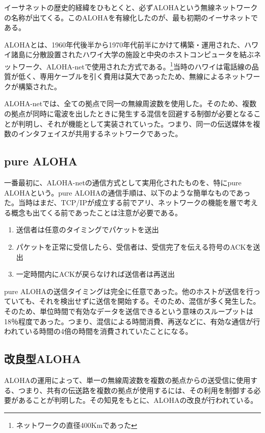 イーサネットの歴史的経緯をひもとくと、必ずALOHAという無線ネットワークの名称が出てくる。このALOHAを有線化したのが、最も初期のイーサネットである。

ALOHAとは、1960年代後半から1970年代前半にかけて構築・運用された、ハワイ諸島に分散設置されたハワイ大学の施設と中央のホストコンピュータを結ぶネットワーク、ALOHA-netで使用された方式である。\footnote{ネットワークの直径400Kmであった}当時のハワイは電話線の品質が低く、専用ケーブルを引く費用は莫大であったため、無線によるネットワークが構築された。

ALOHA-netでは、全ての拠点で同一の無線周波数を使用した。そのため、複数の拠点が同時に電波を出したときに発生する混信を回避する制御が必要となることが判明し、それが機能として実装されていった。つまり、同一の伝送媒体を複数のインタフェイスが共用するネットワークであった。

\subsection{pure ALOHA}

一番最初に、ALOHA-netの通信方式として実用化されたものを、特にpure ALOHAという。pure ALOHAの通信手順は、以下のような簡単なものであった。当時はまだ、TCP/IPが成立する前でアリ、ネットワークの機能を層で考える概念も出てくる前であったことは注意が必要である。

\begin{enumerate}
\item 送信者は任意のタイミングでパケットを送出
\item パケットを正常に受信したら、受信者は、受信完了を伝える符号のACKを送出
\item 一定時間内にACKが戻らなければ送信者は再送出
\end{enumerate}

pure ALOHAの送信タイミングは完全に任意であった。他のホストが送信を行っていても、それを検出せずに送信を開始する。そのため、混信が多く発生した。そのため、単位時間で有効なデータを送信できるという意味のスループットは 18％程度であった。つまり、混信による時間消費、再送などに、有効な通信が行われている時間の4倍の時間を消費されていたことになる。

\subsection{改良型ALOHA}

ALOHAの運用によって、単一の無線周波数を複数の拠点からの送受信に使用する、つまり、共有の伝送路を複数の拠点が使用するには、その利用を制御する必要があることが判明した。その知見をもとに、ALOHAの改良が行われている。

